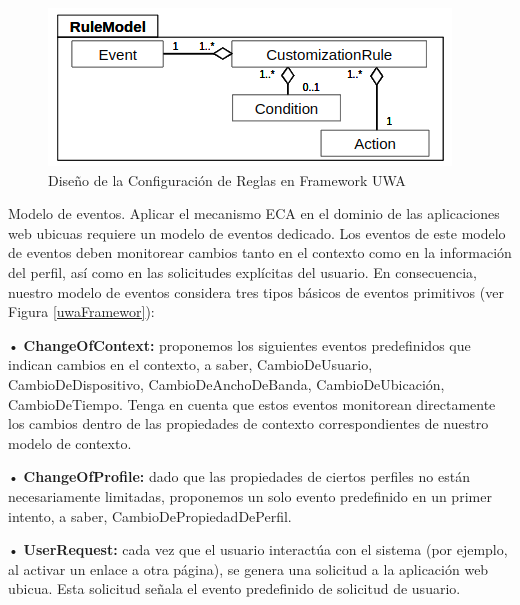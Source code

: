 \begin{figure}[t]
\begin{center}
 \includegraphics[width=5 in,totalheight=3 in]
{Ch1/Figuras/uwa.Regla.png}
\caption{Diseño de la Configuración de Reglas en  Framework UWA}\label{fig:uwa.Reglas}
\end{center}
\end{figure}

Modelo de eventos. Aplicar el mecanismo ECA en el dominio de las aplicaciones web ubicuas requiere un modelo de eventos dedicado. Los eventos de este modelo de eventos deben monitorear cambios tanto en el contexto como en la información del perfil, así como en las solicitudes explícitas del usuario. En consecuencia, nuestro modelo de eventos considera tres tipos básicos de eventos primitivos (ver Figura \ref{uwaFramewor}):

• \textbf{ChangeOfContext:} proponemos los siguientes eventos predefinidos que indican cambios en el contexto, a saber, CambioDeUsuario, CambioDeDispositivo, CambioDeAnchoDeBanda, CambioDeUbicación, CambioDeTiempo. Tenga en cuenta que estos eventos monitorean directamente los cambios dentro de las propiedades de contexto correspondientes de nuestro modelo de contexto.

• \textbf{ChangeOfProfile:} dado que las propiedades de ciertos perfiles no están necesariamente limitadas, proponemos un solo evento predefinido en un primer intento, a saber, CambioDePropiedadDePerfil.

• \textbf{UserRequest:} cada vez que el usuario interactúa con el sistema (por ejemplo, al activar un enlace a otra página), se genera una solicitud a la aplicación web ubicua. Esta solicitud señala el evento predefinido de solicitud de usuario.


